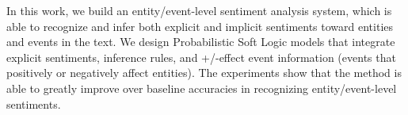 In this work, we build an entity/event-level sentiment analysis system, which is able to recognize and infer both explicit and implicit sentiments toward entities and events in the text. We design Probabilistic Soft Logic models that integrate explicit sentiments, inference rules, and +/-effect event information (events that positively or negatively affect entities). The experiments show that the method is able to greatly improve over baseline accuracies in recognizing entity/event-level sentiments.
